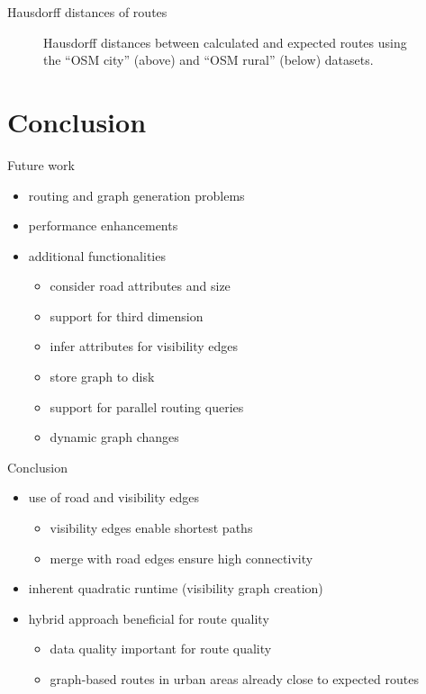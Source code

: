 \documentclass[xcolor={x11names}]{beamer}
\newenvironment{figcenter}
{%
	\parskip=0pt%
	\par%
	\nopagebreak%
	\centering%
}%
{%
	\par%
	\noindent%
	\ignorespacesafterend%
}
\begin{document}
		\begin{frame}{Hausdorff distances of routes}
			\begin{figure}
				\begin{figcenter}
					\scalebox{0.66}
					{
						
					}
					\scalebox{0.66}
					{
						
					}
				\end{figcenter}
				\caption{Hausdorff distances between calculated and expected routes using the \enquote{OSM city} (above) and \enquote{OSM rural} (below) datasets.}
			\end{figure}
		\end{frame}
	
	\section{Conclusion}
	
		\begin{frame}{Future work}
			\begin{itemize}
				\item routing and graph generation problems
				\item performance enhancements
				\item additional functionalities
				\begin{itemize}
					\item consider road attributes and size
					\item support for third dimension
					\item infer attributes for visibility edges
					\item store graph to disk
					\item support for parallel routing queries
					\item dynamic graph changes
				\end{itemize}
			\end{itemize}
		\end{frame}

		\begin{frame}{Conclusion}
			\begin{itemize}
				\item use of road and visibility edges
				\begin{itemize}
					\item visibility edges enable shortest paths
					\item merge with road edges ensure high connectivity
				\end{itemize}
				\item inherent quadratic runtime (visibility graph creation)
				\item hybrid approach beneficial for route quality
				\begin{itemize}
					\item data quality important for route quality
					\item graph-based routes in urban areas already close to expected routes
				\end{itemize}
			\end{itemize}
		\end{frame}		
	
\end{document}
